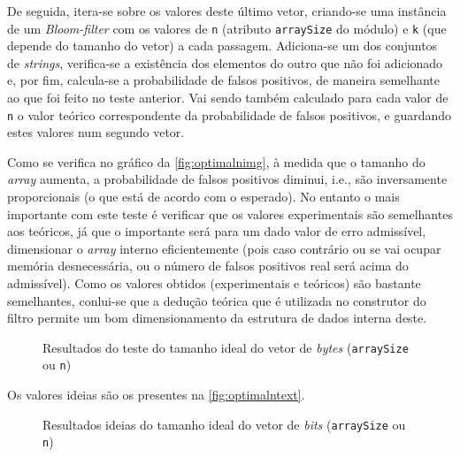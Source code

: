 \documentclass[a4paper,11pt,openright,oneside]{report}
\begin{document}
De seguida, itera-se sobre os valores deste último vetor, criando-se uma instância de um \textit{Bloom-filter} com os valores de \texttt{n} (atributo \texttt{arraySize} do módulo) e \texttt{k} (que depende do tamanho do vetor) a cada passagem. Adiciona-se um dos conjuntos de \textit{strings}, verifica-se a existência dos elementos do outro que não foi adicionado e, por fim, calcula-se a probabilidade de falsos positivos, de maneira semelhante ao que foi feito no teste anterior. Vai sendo também calculado para cada valor de \texttt{n} o valor teórico correspondente da probabilidade de falsos positivos, e guardando estes valores num segundo vetor.

Como se verifica no gráfico da \autoref{fig:optimalnimg}, à medida que o tamanho do \textit{array} aumenta, a probabilidade de falsos positivos diminui, i.e., são inversamente proporcionais (o que está de acordo com o esperado). No entanto o mais importante com este teste é verificar que os valores experimentais são semelhantes aos teóricos, já que o importante será para um dado valor de erro admissível, dimensionar o \textit{array} interno eficientemente (pois caso contrário ou se vai ocupar memória desnecessária, ou o número de falsos positivos real será acima do admissível). Como os valores obtidos (experimentais e teóricos) são bastante semelhantes, conlui-se que a dedução teórica que é utilizada no construtor do filtro permite um bom dimensionamento da estrutura de dados interna deste.

\begin{figure}[ht]	
\center
{}
\caption{Resultados do teste do tamanho ideal do vetor de \textit{bytes} (\texttt{arraySize} ou \texttt{n})}
\label{fig:optimalnimg}
\end{figure}

Os valores ideias são os presentes na \autoref{fig:optimalntext}.

\begin{figure}[ht]	
\center
{}
\caption{Resultados ideias do tamanho ideal do vetor de \textit{bits} (\texttt{arraySize} ou \texttt{n})}
\label{fig:optimalntext}
\end{figure}
\end{document}
